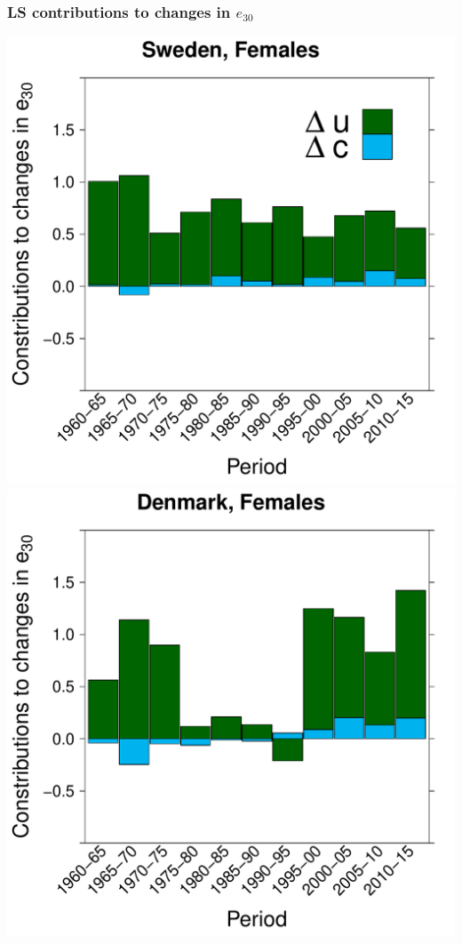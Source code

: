 \documentclass[12pt, xcolor=table]{beamer}  %
\begin{document}
\begin{frame}[noframenumbering]
	\frametitle{LS contributions to changes in $e_{30}$}
	\vspace{-0.25cm}
	\begin{center}
		\includegraphics[scale=0.32]{Figures/Ch1/F5a}\includegraphics[scale=0.32]{Figures/Ch1/F5b}

\end{center}
\end{frame}
\end{document}
